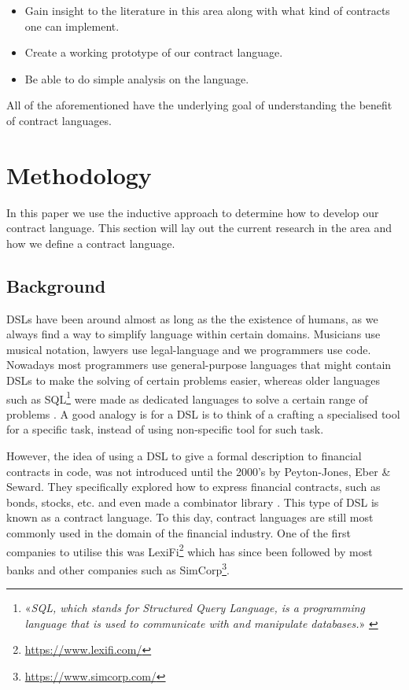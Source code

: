 \documentclass{ituthesis}
\begin{document}
\begin{itemize}
    \item Gain insight to the literature in this area along with what kind of contracts one can implement.
    \item Create a working prototype of our contract language.
    \item Be able to do simple analysis on the language.
\end{itemize}

All of the aforementioned have the underlying goal of understanding the benefit of contract languages.

\chapter{Methodology}


In this paper we use the inductive approach to determine how to develop our contract language. This section will lay out the current research in the area and how we define a contract language.

\section{Background}
DSLs have been around almost as long as the the existence of humans, as we always find a way to simplify language within certain domains. Musicians use musical notation, lawyers use legal-language and we programmers use code. Nowadays most programmers use general-purpose languages that might contain DSLs to make the solving of certain problems easier, whereas older languages such as SQL\footnote{«\textit{SQL, which stands for Structured Query Language, is a programming language that is used to communicate with and manipulate databases.}» \cite{whatisSQL}} were made as dedicated languages to solve a certain range of problems \cite{van2000domain}. A good analogy is for a DSL is to think of a crafting a specialised tool for a specific task, instead of using non-specific tool for such task.

However, the idea of using a DSL to give a formal description to financial contracts in code, was not introduced until the 2000's by Peyton-Jones, Eber \& Seward. They specifically explored how to express financial contracts, such as bonds, stocks, etc. and even made a combinator library \cite{peyton2000composing}. This type of DSL is known as a contract language. To this day, contract languages are still most commonly used in the domain of the financial industry. One of the first companies to utilise this was LexiFi\footnote{\url{https://www.lexifi.com/}} which has since been followed by most banks and other companies such as SimCorp\footnote{\url{https://www.simcorp.com/}}.
\end{document}
